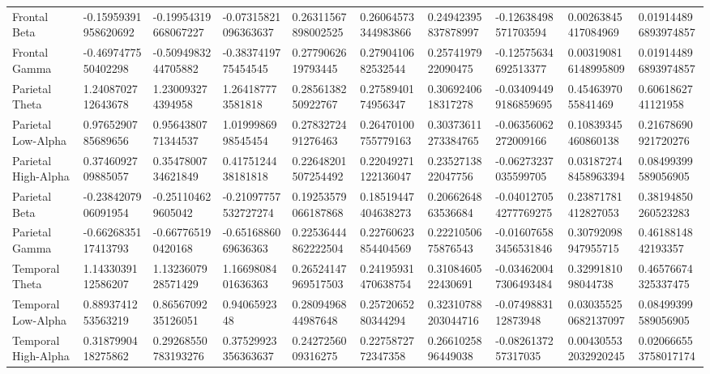 \begin{longtable}{llllllllll}
Frontal Beta         &  -0.15959391958620692 &  -0.19954319668067227 &   -0.07315821096363637 &  0.26311567898002525 &  0.26064573344983866 &  0.24942395837878997 &    -0.12638498571703594 &     0.00263845417084969 &  0.019144896893974857 \\
Frontal Gamma        &   -0.4697477550402298 &   -0.5094983244705882 &    -0.3837419775454545 &   0.2779062619793445 &   0.2790410682532544 &   0.2574197922090475 &    -0.12575634692513377 &    0.003190816148995809 &  0.019144896893974857 \\
Parietal Theta       &    1.2408702712643678 &     1.230093274394958 &      1.264187773581818 &   0.2856138250922767 &   0.2758940174956347 &   0.3069240618317278 &   -0.034094499186859695 &      0.4546397055841469 &    0.6061862741121958 \\
Parietal Low-Alpha   &    0.9765290785689656 &    0.9564380771344537 &     1.0199986998545454 &   0.2783272491276463 &  0.26470100755779163 &  0.30373611273384765 &    -0.06356062272009166 &     0.10839345460860138 &   0.21678690921720276 \\
Parietal High-Alpha  &    0.3746092709885057 &    0.3547800734621849 &     0.4175124438181818 &  0.22648201507254492 &  0.22049271122136047 &   0.2352713822047756 &    -0.06273237035599705 &    0.031872748458963394 &   0.08499399589056905 \\
Parietal Beta        &   -0.2384207906091954 &    -0.251104629605042 &   -0.21097757532727274 &  0.19253579066187868 &  0.18519447404638273 &   0.2066264863536684 &   -0.040127054277769275 &     0.23871781412827053 &   0.38194850260523283 \\
Parietal Gamma       &   -0.6626835117413793 &    -0.667765190420168 &    -0.6516886069636363 &  0.22536444862222504 &  0.22760623854404569 &   0.2221050675876543 &   -0.016076583456531846 &     0.30792098947955715 &    0.4618814842193357 \\
Temporal Theta       &    1.1433039112586207 &    1.1323607928571429 &     1.1669808401636363 &  0.26524147969517503 &  0.24195931470638754 &   0.3108460522430691 &   -0.034620047306493484 &      0.3299181098044738 &   0.46576674325337475 \\
Temporal Low-Alpha   &    0.8893741253563219 &    0.8656709235126051 &           0.9406592348 &   0.2809496844987648 &   0.2572065280344294 &  0.32310788203044716 &     -0.0749883112873948 &    0.030355250682137097 &   0.08499399589056905 \\
Temporal High-Alpha  &    0.3187990418275862 &   0.29268550783193276 &    0.37529923356363637 &   0.2427256009316275 &   0.2275872772347358 &   0.2661025896449038 &     -0.0826137257317035 &    0.004305532032920245 &  0.020666553758017174 \\

\end{longtable}
